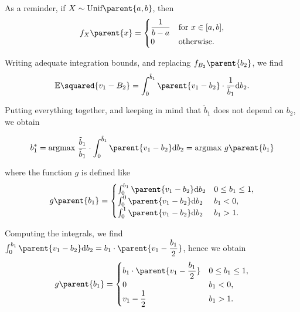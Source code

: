 As a reminder, if $X \sim \text{Unif} \parent{a, b}$, then
\begin{equation*}
f_{X}\parent{x} = 
    \begin{cases}
        \dfrac{1}{b-a}  & {\text{for }} x \in [a,b], \\
        0               & {\text{otherwise}}.
    \end{cases}
\end{equation*}


Writing adequate integration bounds, and replacing $f_{B_2} \parent{b_2}$, we find
\begin{equation*}
    \mathbb{E} \squared{v_1 - B_2}
    = \int_{0}^{\tilde{b}_1} \parent{v_1 - b_2} \cdot \dfrac{1}{\tilde{b}_1} \mathrm{d} b_2.
\end{equation*}

Putting everything together, and keeping in mind that $\tilde{b}_1$ does not depend on $b_2$, we obtain

\begin{equation*}
    b_1^{*}
    = \text{argmax} \ \dfrac{\tilde{b}_1}{\tilde{b}_1} \cdot \int_{0}^{\tilde{b}_1} \parent{v_1 - b_2} \mathrm{d} b_2
    = \text{argmax} \ g \parent{b_1}
\end{equation*}

where the function $g$ is defined like
\begin{equation*}
    g \parent{b_1}
    =
    \begin{cases}
       \int_{0}^{b_1} \parent{v_1 - b_2} \mathrm{d} b_2     & 0 \leq b_1 \leq 1, \\
       \int_{0}^{0} \parent{v_1 - b_2} \mathrm{d} b_2       & b_1 < 0, \\
       \int_{0}^{1} \parent{v_1 - b_2} \mathrm{d} b_2       & b_1 > 1. \\ 
     \end{cases}
\end{equation*}

Computing the integrals, we find $\int_{0}^{b_1} \parent{v_1 - b_2} \mathrm{d} b_2 = b_1 \cdot \parent{v_1 - \dfrac{b_1}{2}}$, hence we obtain
\begin{equation*}
    g \parent{b_1}
    =
    \begin{cases}
       b_{1} \cdot \parent{v_1 - \dfrac{b_1}{2}}    & 0 \leq b_1 \leq 1, \\
       0                                            & b_1 < 0, \\
       v_1 - \dfrac{1}{2}                           & b_1 > 1. \\ 
     \end{cases}
\end{equation*}

